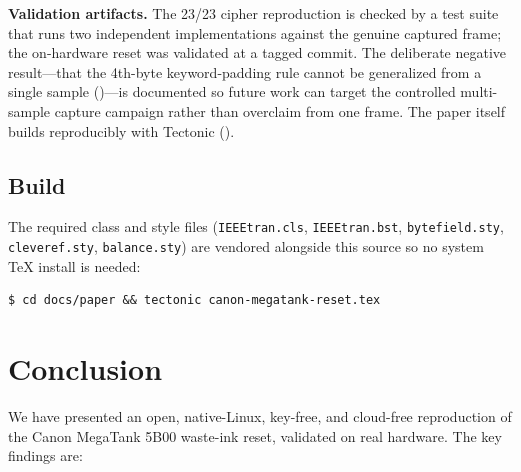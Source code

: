 \documentclass[conference]{IEEEtran}
\begin{document}
\textbf{Validation artifacts.} The 23/23 cipher reproduction is checked by
a test suite that runs two independent implementations against the genuine
captured frame; the on-hardware reset was validated at a tagged commit. The
deliberate negative result---that the 4th-byte keyword-padding rule cannot
be generalized from a single sample ()---is
documented so future work can target the controlled multi-sample
capture campaign rather than overclaim from one frame. The paper itself
builds reproducibly with Tectonic ().

\subsection{Build}
\label{sec:artifact-build}

The required class and style files (\texttt{IEEEtran.cls},
\texttt{IEEEtran.bst}, \texttt{bytefield.sty}, \texttt{cleveref.sty},
\texttt{balance.sty}) are vendored alongside this source so no system TeX
install is needed:

\begin{lstlisting}[style=shell,caption={Reproducible build.},label={lst:build}]
$ cd docs/paper && tectonic canon-megatank-reset.tex
\end{lstlisting}

\section{Conclusion}
\label{sec:conclusion}

We have presented an open, native-Linux, key-free, and cloud-free
reproduction of the Canon MegaTank 5B00 waste-ink reset, validated on real
hardware. The key findings are:
\end{document}
